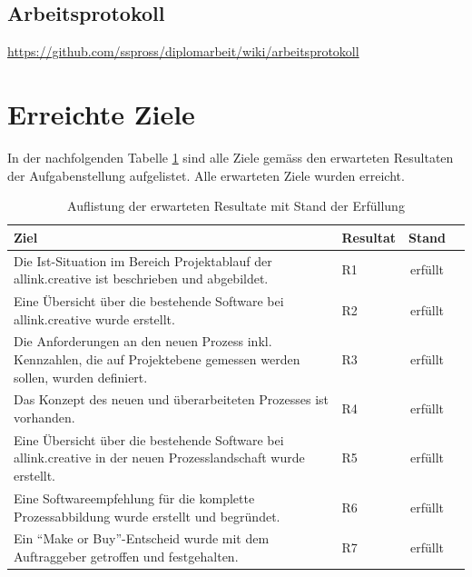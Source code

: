 \subsection{Arbeitsprotokoll}
\url{https://github.com/sspross/diplomarbeit/wiki/arbeitsprotokoll}

\section{Erreichte Ziele}
In der nachfolgenden Tabelle \ref{tab:erreichte_ziele} sind alle Ziele gemäss 
den erwarteten Resultaten der Aufgabenstellung aufgelistet. Alle 
erwarteten Ziele wurden erreicht.

\begin{table}[htbp]
\begin{center}
    \begin{tabular}{p{10cm}lcl}
        \toprule \textbf{Ziel} & \textbf{Resultat} & \textbf{Stand} \\
        \midrule Die Ist-Situation im Bereich Projektablauf der allink.creative
            ist beschrieben und abgebildet. & R1 & erfüllt \\
        \midrule Eine Übersicht über die bestehende Software bei allink.creative
            wurde erstellt. & R2 & erfüllt \\
        \midrule Die Anforderungen an den neuen Prozess inkl. Kennzahlen, die auf 
            Projektebene gemessen werden sollen, wurden definiert. & R3 
            & erfüllt \\
        \midrule Das Konzept des neuen und überarbeiteten Prozesses ist 
            vorhanden. & R4 & erfüllt \\
        \midrule Eine Übersicht über die bestehende Software bei allink.creative
            in der neuen Prozesslandschaft wurde erstellt. & R5 & erfüllt \\
        \midrule Eine Softwareempfehlung für die komplette Prozessabbildung
            wurde erstellt und begründet. & R6 & erfüllt \\
        \midrule Ein ``Make or Buy''-Entscheid wurde mit dem Auftraggeber 
            getroffen und festgehalten. & R7 & erfüllt \\
        \bottomrule
    \end{tabular}
    \caption{Auflistung der erwarteten Resultate mit Stand der Erfüllung}
    \label{tab:erreichte_ziele}
\end{center}
\end{table}